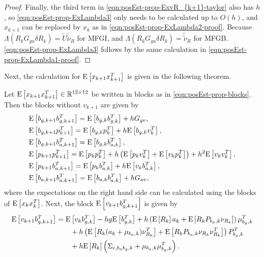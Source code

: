 \begin{proof}
	Finally, the third term in \eqref{eqn:posEst-prop-ExvR_{k+1}-taylor} also has $h$, so \eqref{eqn:posEst-prop-ExLambda3} only needs to be calculated up to $O(h)$, and $x_{k+1}$ can be replaced by $x_k$ as in \eqref{eqn:posEst-prop-ExLambda2-proof}.
	Because $\Lambda(R_kG_{gu}\delta R_k) = \tilde{U}\tilde{\tilde{\nu}}_R$ for MFGI, and $\Lambda(R_kG_{gu}\delta R_k) = \tilde{\tilde{\nu}}_R$ for MFGB.
	\eqref{eqn:posEst-prop-ExLambda3} follows by the same calculation in \eqref{eqn:posEst-prop-ExLambda1-proof}.
\end{proof}

Next, the calculation for $\mathrm{E}\left[ x_{k+1}x_{k+1}^T \right]$ is given in the following theorem.
\begin{theorem} \label{thm:posEst-prop-Exx}
	Let $\mathrm{E}\left[ x_{k+1}x_{k+1}^T \right] \in \mathbb{R}^{12\times 12}$ be written in blocks as in \eqref{eqn:posEst-prop-blocks}.
	Then the blocks without $v_{k+1}$ are given by
	\begin{align}
		&\mathrm{E}\left[ b_{g,k+1}b_{g,k+1}^T \right] = \mathrm{E}\left[ b_{g,k}b_{g,k}^T \right] + hG_{gv}, \label{eqn:posEst-prop-Ebgbg} \\
		&\mathrm{E}\left[ b_{g,k+1}p_{k+1}^T \right] = \mathrm{E}\left[ b_{g,k}p_k^T \right] + h\mathrm{E}\left[ b_{g,k}v_k^T \right], \\
		&\mathrm{E}\left[ b_{g,k+1}b_{a,k+1}^T \right] = \mathrm{E}\left[ b_{g,k}b_{a,k}^T \right], \\
		&\mathrm{E}\left[ p_{k+1}p_{k+1}^T \right] = \mathrm{E}\left[ p_kp_k^T \right] + h\left(\mathrm{E}\left[ p_kv_k^T \right] + \mathrm{E}\left[ v_kp_k^T \right]\right) + h^2\mathrm{E}\left[ v_kv_k^T \right], \\
		&\mathrm{E}\left[ p_{k+1}b_{a,k+1}^T \right] = \mathrm{E}\left[ p_kb_{a,k}^T \right] + h\mathrm{E}\left[ v_kb_{a,k}^T \right], \\
		&\mathrm{E}\left[ b_{a,k+1}b_{a,k+1}^T \right] = \mathrm{E}\left[ b_{a,k}b_{a,k}^T \right] + hG_{av}, \label{eqn:posEst-prop-Ebaba}
	\end{align}
	where the expectations on the right hand side can be calculated using the blocks of $\mathrm{E}\left[ x_kx_k^T \right]$.
	Next, the block $\mathrm{E}\left[ v_{k+1}b_{g,k+1}^T \right]$ is given by
	\begin{align} \label{eqn:posEst-prop-Evbg}
		\mathrm{E}\left[ v_{k+1}b_{g,k+1}^T \right] &= \mathrm{E}\left[ v_kb_{g,k}^T \right] - hg\mathrm{E}\left[ b_{g,k}^T \right] + h\left( \mathrm{E}\left[ R_k \right]a_k + \mathrm{E}\left[ R_kP_{b_a,k}\nu_{R_k} \right] \right) \mu_{b_g,k}^T \nonumber \\
		&\qquad + h\left( \mathrm{E}\left[ R_k(a_k+\mu_{b_a,k})\nu_{R_k}^T \right] + \mathrm{E}\left[ R_kP_{b_a,k}\nu_{R_k}\nu_{R_k}^T \right] \right) P_{b_g,k}^T \nonumber \\
		&\qquad + h\mathrm{E}\left[ R_k \right] \left( \Sigma_{c,b_ab_g,k} + \mu_{b_a,k}\mu_{b_g,k}^T \right).
	\end{align}

\end{theorem}
